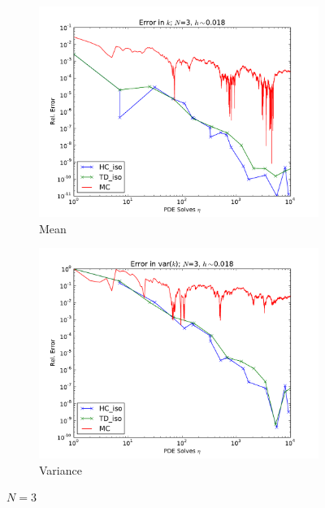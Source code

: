 \documentclass[11pt]{article}
\begin{document}
\begin{figure}[H]
\centering
  \begin{subfigure}[b]{0.49 \textwidth}
   \includegraphics[width=\textwidth]{N3_h5_MCHC}
   \caption{Mean}
   \label{n3mean}
  \end{subfigure}
  \begin{subfigure}[b]{0.49 \textwidth}
   \includegraphics[width=\textwidth]{N3_h5_MCHC_2}
   \caption{Variance}
   \label{n3var}
  \end{subfigure}
  \caption{$N=3$}
  \label{n3}
\end{figure}
\end{document}

